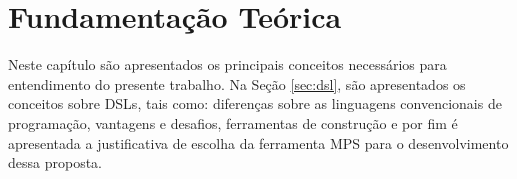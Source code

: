 \chapter{Fundamentação Teórica}
\label{chap:fundamentacao}

Neste capítulo são apresentados os principais conceitos necessários para entendimento do presente trabalho. Na Seção \ref{sec:dsl}, são apresentados os conceitos sobre \gls{DSL}s, tais como: diferenças sobre as linguagens convencionais de programação, vantagens e desafios, ferramentas de construção e por fim é apresentada a justificativa de escolha da ferramenta \gls{MPS} para o desenvolvimento dessa proposta.






